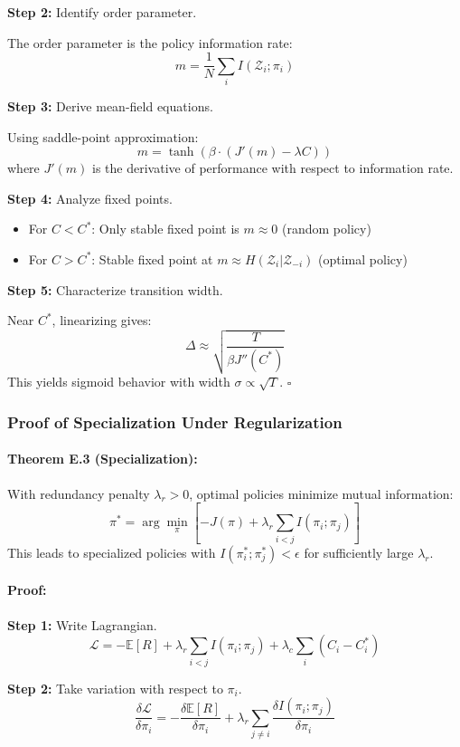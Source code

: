 \documentclass[10pt, letterpaper]{article}
\begin{document}
\textbf{Step 2:} Identify order parameter.

The order parameter is the policy information rate:
\[m = \frac{1}{N} \sum_i I(\mathcal{Z}_i; \pi_i)\]

\textbf{Step 3:} Derive mean-field equations.

Using saddle-point approximation:
\[m = \tanh(\beta \cdot (J'(m) - \lambda C))\]
where $J'(m)$ is the derivative of performance with respect to information rate.

\textbf{Step 4:} Analyze fixed points.
\begin{itemize}
    \item For $C < C^*$: Only stable fixed point is $m \approx 0$ (random policy)
    \item For $C > C^*$: Stable fixed point at $m \approx H(\mathcal{Z}_i | \mathcal{Z}_{-i})$ (optimal policy)
\end{itemize}

\textbf{Step 5:} Characterize transition width.

Near $C^*$, linearizing gives:
\[\Delta \approx \sqrt{\frac{T}{\beta J''(C^*)}}\]
This yields sigmoid behavior with width $\sigma \propto \sqrt{T}$. $\square$

\subsubsection{Proof of Specialization Under Regularization}

\paragraph{Theorem E.3 (Specialization):} With redundancy penalty $\lambda_r > 0$, optimal policies minimize mutual information:
\[\pi^* = \arg\min_{\pi} \left[-J(\pi) + \lambda_r \sum_{i<j} I(\pi_i; \pi_j)\right]\]
This leads to specialized policies with $I(\pi^*_i; \pi^*_j) < \epsilon$ for sufficiently large $\lambda_r$.

\paragraph{Proof:}

\textbf{Step 1:} Write Lagrangian.
\[\mathcal{L} = -\mathbb{E}[R] + \lambda_r \sum_{i<j} I(\pi_i; \pi_j) + \lambda_c \sum_i (C_i - C^*_i)\]

\textbf{Step 2:} Take variation with respect to $\pi_i$.
\[\frac{\delta \mathcal{L}}{\delta \pi_i} = -\frac{\delta \mathbb{E}[R]}{\delta \pi_i} + \lambda_r \sum_{j \neq i} \frac{\delta I(\pi_i; \pi_j)}{\delta \pi_i}\]
\end{document}

